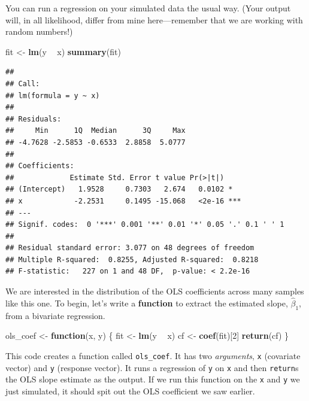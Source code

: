 \documentclass[12pt,oneside,openany]{book}
\newenvironment{Shaded}{\begin{snugshade}}{\end{snugshade}}
\newcommand{\KeywordTok}[1]{\textcolor[rgb]{0.13,0.29,0.53}{\textbf{#1}}}
\newcommand{\DecValTok}[1]{\textcolor[rgb]{0.00,0.00,0.81}{#1}}
\newcommand{\StringTok}[1]{\textcolor[rgb]{0.31,0.60,0.02}{#1}}
\newcommand{\ControlFlowTok}[1]{\textcolor[rgb]{0.13,0.29,0.53}{\textbf{#1}}}
\newcommand{\OperatorTok}[1]{\textcolor[rgb]{0.81,0.36,0.00}{\textbf{#1}}}
\newcommand{\NormalTok}[1]{#1}
\begin{document}
You can run a regression on your simulated data the usual way. (Your
output will, in all likelihood, differ from mine here---remember that we
are working with random numbers!)

\begin{Shaded}
\begin{Highlighting}[]
\NormalTok{fit <-}\StringTok{ }\KeywordTok{lm}\NormalTok{(y }\OperatorTok{~}\StringTok{ }\NormalTok{x)}
\KeywordTok{summary}\NormalTok{(fit)}
\end{Highlighting}
\end{Shaded}

\begin{verbatim}
## 
## Call:
## lm(formula = y ~ x)
## 
## Residuals:
##     Min      1Q  Median      3Q     Max 
## -4.7628 -2.5853 -0.6533  2.8858  5.0777 
## 
## Coefficients:
##             Estimate Std. Error t value Pr(>|t|)    
## (Intercept)   1.9528     0.7303   2.674   0.0102 *  
## x            -2.2531     0.1495 -15.068   <2e-16 ***
## ---
## Signif. codes:  0 '***' 0.001 '**' 0.01 '*' 0.05 '.' 0.1 ' ' 1
## 
## Residual standard error: 3.077 on 48 degrees of freedom
## Multiple R-squared:  0.8255, Adjusted R-squared:  0.8218 
## F-statistic:   227 on 1 and 48 DF,  p-value: < 2.2e-16
\end{verbatim}

We are interested in the distribution of the OLS coefficients across
many samples like this one. To begin, let's write a \textbf{function} to
extract the estimated slope, \(\hat{\beta}_1\), from a bivariate
regression.

\begin{Shaded}
\begin{Highlighting}[]
\NormalTok{ols_coef <-}\StringTok{ }\ControlFlowTok{function}\NormalTok{(x, y) \{}
\NormalTok{  fit <-}\StringTok{ }\KeywordTok{lm}\NormalTok{(y }\OperatorTok{~}\StringTok{ }\NormalTok{x)}
\NormalTok{  cf <-}\StringTok{ }\KeywordTok{coef}\NormalTok{(fit)[}\DecValTok{2}\NormalTok{]}
  \KeywordTok{return}\NormalTok{(cf)}
\NormalTok{\}}
\end{Highlighting}
\end{Shaded}

This code creates a function called \texttt{ols\_coef}. It has two
\emph{arguments}, \texttt{x} (covariate vector) and \texttt{y} (response
vector). It runs a regression of \texttt{y} on \texttt{x} and then
\texttt{return}s the OLS slope estimate as the output. If we run this
function on the \texttt{x} and \texttt{y} we just simulated, it should
spit out the OLS coefficient we saw earlier.
\end{document}
